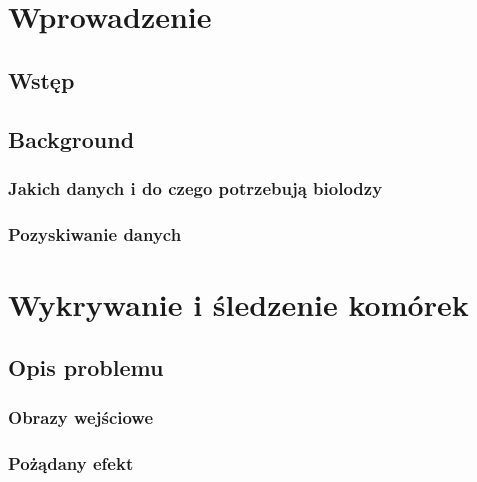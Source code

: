 \documentclass[declaration,shortabstract]{iithesis}
\author         {Artur Rosa}
\begin{document}

\chapter{Wprowadzenie}


\section{Wstęp}




\section{Background}


\subsection{Jakich danych i do czego potrzebują biolodzy}

\subsection{Pozyskiwanie danych}



\chapter{Wykrywanie i śledzenie komórek}

\section{Opis problemu}
\label{sec:problem}

\subsection{Obrazy wejściowe}
\label{sec:input-images}


\subsection{Pożądany efekt}
\label{sec:output}
\end{document}
